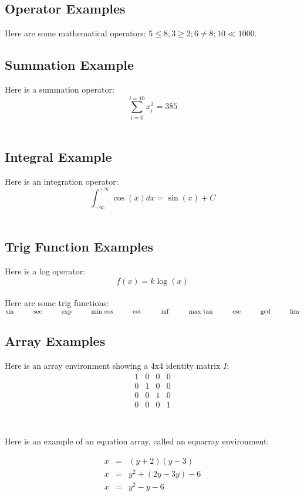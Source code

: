\documentclass[11pt]{article}
\begin{document}
\subsection{Operator Examples}
Here are some mathematical operators: $5 \leq 8; 3 \geq 2; 6 \neq 8; 10 \ll 1000$.\\

\subsection{Summation Example}
Here is a summation operator:
\[ \sum_{i=0}^{i=10} x_{i}^{2} = 385\]\\

\subsection{Integral Example}
Here is an integration operator:
\[ \int_{-\infty}^{+\infty}\cos(x)dx=\sin(x)+C\]\\

\subsection{Trig Function Examples}
Here is a log operator:
\[f(x) = k\log(x) \]\\
Here are some trig functions:\\
\hspace{10mm}
$\sin \hspace{10mm}  \sec \hspace{10mm} \exp \hspace{10mm} \min \\
\cos \hspace{10mm} \cot \hspace{10mm} \inf \hspace{10mm} \max \\
\tan \hspace{10mm} \csc \hspace{10mm} \gcd \hspace{10mm} \lim $

\subsection{Array Examples}
Here is an array environment showing a 4x4 identity matrix $I$:
\[
	\begin{array}{cccc}
		1 & 0 & 0 & 0 \\
		0 & 1 & 0 & 0 \\
		0 & 0 & 1 & 0 \\
		0 & 0 & 0 & 1 \\
		\end{array}
\]
\\
\\
Here is an example of an equation array, called an eqnarray environment:

\begin{eqnarray}
x & = & (y + 2) (y-3) \\
x & = & y^{2} + (2y-3y)-6\\
x & = & y^{2}-y-6
\end{eqnarray}
\end{document}
